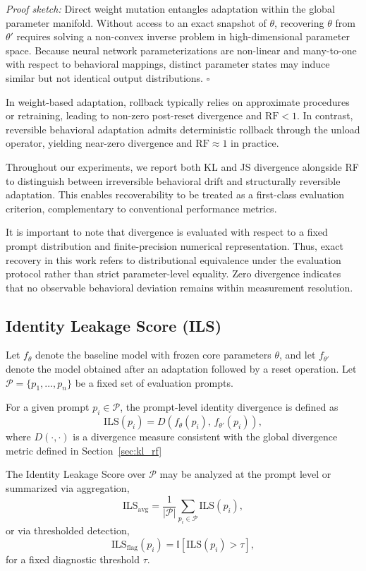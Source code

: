 \documentclass[10pt]{article}
\begin{document}
\textit{Proof sketch:}
Direct weight mutation entangles adaptation within the global parameter manifold. Without access to an exact snapshot of $\theta$, recovering $\theta$ from $\theta'$ requires solving a non-convex inverse problem in high-dimensional parameter space. Because neural network parameterizations are non-linear and many-to-one with respect to behavioral mappings, distinct parameter states may induce similar but not identical output distributions.
\hfill $\square$

In weight-based adaptation, rollback typically relies on approximate procedures or retraining, leading to non-zero post-reset divergence and $\mathrm{RF} < 1$. In contrast, reversible behavioral adaptation admits deterministic rollback through the unload operator, yielding near-zero divergence and $\mathrm{RF} \approx 1$ in practice.

Throughout our experiments, we report both KL and JS divergence alongside RF to distinguish between irreversible behavioral drift and structurally reversible adaptation. This enables recoverability to be treated as a first-class evaluation criterion, complementary to conventional performance metrics.

It is important to note that divergence is evaluated with respect to a fixed prompt distribution and finite-precision numerical representation. Thus, exact recovery in this work refers to distributional equivalence under the evaluation protocol rather than strict parameter-level equality. Zero divergence indicates that no observable behavioral deviation remains within measurement resolution.
	
	\subsection{Identity Leakage Score (ILS)}
	\label{sec:ils}
	
	Let $f_{\theta}$ denote the baseline model with frozen core parameters $\theta$, and let $f_{\theta'}$ denote the model obtained after an adaptation followed by a reset operation. Let $\mathcal{P} = \{p_1, \dots, p_n\}$ be a fixed set of evaluation prompts.
	
	For a given prompt $p_i \in \mathcal{P}$, the prompt-level identity divergence is defined as
	\[
	\mathrm{ILS}(p_i) = D\!\left( f_{\theta}(p_i),\, f_{\theta'}(p_i) \right),
	\]
	where $D(\cdot,\cdot)$ is a divergence measure consistent with the global divergence metric defined in Section~\ref{sec:kl_rf}
	
	The Identity Leakage Score over $\mathcal{P}$ may be analyzed at the prompt level or summarized via aggregation,
	\[
	\mathrm{ILS}_{\mathrm{avg}} = \frac{1}{|\mathcal{P}|} \sum_{p_i \in \mathcal{P}} \mathrm{ILS}(p_i),
	\]
	or via thresholded detection,
	\[
	\mathrm{ILS}_{\mathrm{flag}}(p_i) = \mathbb{I}\!\left[ \mathrm{ILS}(p_i) > \tau \right],
	\]
	for a fixed diagnostic threshold $\tau$.
	
\end{document}
